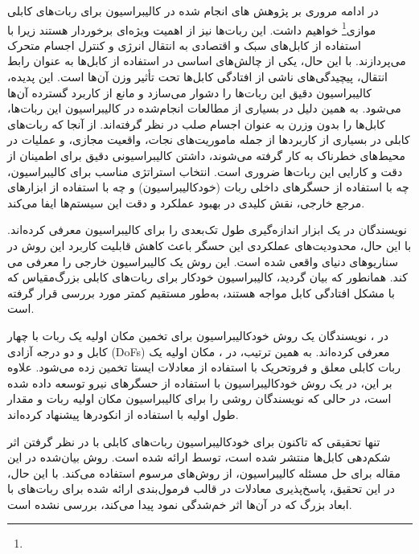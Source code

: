 در ادامه مروری بر پژوهش های انجام شده در کالیبراسیون برای ربات‌های کابلی موازی\footnote{}
خواهیم داشت. این ربات‌ها نیز از اهمیت ویژه‌ای برخوردار هستند زیرا با استفاده از کابل‌های سبک و اقتصادی به انتقال انرژی و کنترل اجسام متحرک می‌پردازند. با این حال، یکی از چالش‌های اساسی در استفاده از کابل‌ها به عنوان رابط انتقال، پیچیدگی‌های ناشی از افتادگی کابل‌ها تحت تأثیر وزن آن‌ها است. این پدیده، کالیبراسیون دقیق این ربات‌ها را دشوار می‌سازد و مانع از کاربرد گسترده آن‌ها می‌شود. به همین دلیل در بسیاری از مطالعات انجام‌شده در کالیبراسیون این ربات‌ها، کابل‌ها را بدون وزرن به عنوان اجسام صلب در نظر گرفته‌اند. از آنجا که ربات‌های کابلی در بسیاری از کاربردها از جمله ماموریت‌های نجات، واقعیت مجازی، و عملیات در محیط‌های خطرناک به کار گرفته می‌شوند، داشتن کالیبراسیونی دقیق برای اطمینان از دقت و کارایی این ربات‌ها ضروری است. انتخاب استراتژی مناسب برای کالیبراسیون، چه با استفاده از حسگرهای داخلی ربات (خودکالیبراسیون) و چه با استفاده از ابزارهای مرجع خارجی، نقش کلیدی در بهبود عملکرد و دقت این سیستم‌ها ایفا می‌کند. 
 
نویسندگان در \cite{jin2018geometric} یک ابزار اندازه‌گیری طول تک‌بعدی را برای کالیبراسیون معرفی کرده‌اند. با این حال، محدودیت‌های عملکردی این حسگر باعث کاهش قابلیت کاربرد این روش در سناریوهای دنیای واقعی شده است. این روش یک کالیبراسیون خارجی را معرفی می کند. همانطور که بیان گردید، کالیبراسیون خودکار برای ربات‌های کابلی بزرگ‌مقیاس که با مشکل افتادگی کابل مواجه هستند، به‌طور مستقیم کمتر مورد بررسی قرار گرفته است. 

در \cite{borgstrom2009nims}، نویسندگان یک روش خودکالیبراسیون برای تخمین مکان اولیه یک ربات با چهار کابل و دو درجه آزادی (DoFs) معرفی کرده‌اند. به همین ترتیب، در \cite{ida2019automatic}، مکان اولیه یک ربات کابلی معلق و فروتحریک با استفاده از معادلات ایستا تخمین زده می‌شود. علاوه بر این، در \cite{pott2013cable_ForceSensorCalib} یک روش خودکالیبراسیون با استفاده از حسگرهای نیرو توسعه داده شده است، در حالی که نویسندگان \cite{darvin2018initial} روشی را برای کالیبراسیون مکان اولیه ربات و مقدار طول اولیه با استفاده از انکودرها پیشنهاد کرده‌اند. 
 
تنها تحقیقی که تاکنون برای خودکالیبراسیون ربات‌های کابلی با در نظر گرفتن اثر شکم‌دهی کابل‌ها منتشر شده است، توسط \cite{an2022all} ارائه شده است. روش بیان‌شده در این مقاله برای حل مسئله کالیبراسیون، از روش‌های مرسوم استفاده می‌کند. با این حال، در این تحقیق، پاسخ‌پذیری معادلات در قالب فرمول‌بندی ارائه شده برای ربات‌های با ابعاد بزرگ که در آن‌ها اثر خم‌شدگی نمود پیدا می‌کند، بررسی نشده است.



